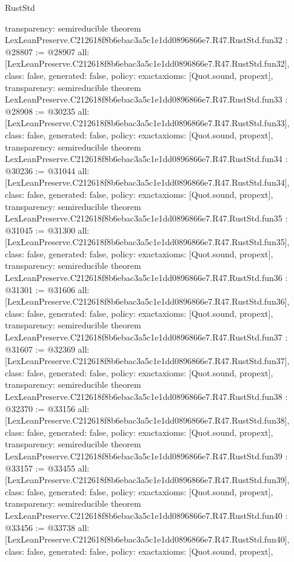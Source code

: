 \begin{lexlean}{RustStd}
\begin{coremodule}
{  transparency: semireducible
}
theorem LexLeanPreserve.C212618f8b6ebac3a5c1e1dd0896866e7.R47.RustStd.fun32 : @28807 := @28907 {
  all: [LexLeanPreserve.C212618f8b6ebac3a5c1e1dd0896866e7.R47.RustStd.fun32],
  class: false,
  generated: false,
  policy: exact{axioms: [Quot.sound, propext]},
  transparency: semireducible
}
theorem LexLeanPreserve.C212618f8b6ebac3a5c1e1dd0896866e7.R47.RustStd.fun33 : @28908 := @30235 {
  all: [LexLeanPreserve.C212618f8b6ebac3a5c1e1dd0896866e7.R47.RustStd.fun33],
  class: false,
  generated: false,
  policy: exact{axioms: [Quot.sound, propext]},
  transparency: semireducible
}
theorem LexLeanPreserve.C212618f8b6ebac3a5c1e1dd0896866e7.R47.RustStd.fun34 : @30236 := @31044 {
  all: [LexLeanPreserve.C212618f8b6ebac3a5c1e1dd0896866e7.R47.RustStd.fun34],
  class: false,
  generated: false,
  policy: exact{axioms: [Quot.sound, propext]},
  transparency: semireducible
}
theorem LexLeanPreserve.C212618f8b6ebac3a5c1e1dd0896866e7.R47.RustStd.fun35 : @31045 := @31300 {
  all: [LexLeanPreserve.C212618f8b6ebac3a5c1e1dd0896866e7.R47.RustStd.fun35],
  class: false,
  generated: false,
  policy: exact{axioms: [Quot.sound, propext]},
  transparency: semireducible
}
theorem LexLeanPreserve.C212618f8b6ebac3a5c1e1dd0896866e7.R47.RustStd.fun36 : @31301 := @31606 {
  all: [LexLeanPreserve.C212618f8b6ebac3a5c1e1dd0896866e7.R47.RustStd.fun36],
  class: false,
  generated: false,
  policy: exact{axioms: [Quot.sound, propext]},
  transparency: semireducible
}
theorem LexLeanPreserve.C212618f8b6ebac3a5c1e1dd0896866e7.R47.RustStd.fun37 : @31607 := @32369 {
  all: [LexLeanPreserve.C212618f8b6ebac3a5c1e1dd0896866e7.R47.RustStd.fun37],
  class: false,
  generated: false,
  policy: exact{axioms: [Quot.sound, propext]},
  transparency: semireducible
}
theorem LexLeanPreserve.C212618f8b6ebac3a5c1e1dd0896866e7.R47.RustStd.fun38 : @32370 := @33156 {
  all: [LexLeanPreserve.C212618f8b6ebac3a5c1e1dd0896866e7.R47.RustStd.fun38],
  class: false,
  generated: false,
  policy: exact{axioms: [Quot.sound, propext]},
  transparency: semireducible
}
theorem LexLeanPreserve.C212618f8b6ebac3a5c1e1dd0896866e7.R47.RustStd.fun39 : @33157 := @33455 {
  all: [LexLeanPreserve.C212618f8b6ebac3a5c1e1dd0896866e7.R47.RustStd.fun39],
  class: false,
  generated: false,
  policy: exact{axioms: [Quot.sound, propext]},
  transparency: semireducible
}
theorem LexLeanPreserve.C212618f8b6ebac3a5c1e1dd0896866e7.R47.RustStd.fun40 : @33456 := @33738 {
  all: [LexLeanPreserve.C212618f8b6ebac3a5c1e1dd0896866e7.R47.RustStd.fun40],
  class: false,
  generated: false,
  policy: exact{axioms: [Quot.sound, propext]},
}
\end{coremodule}
\end{lexlean}
